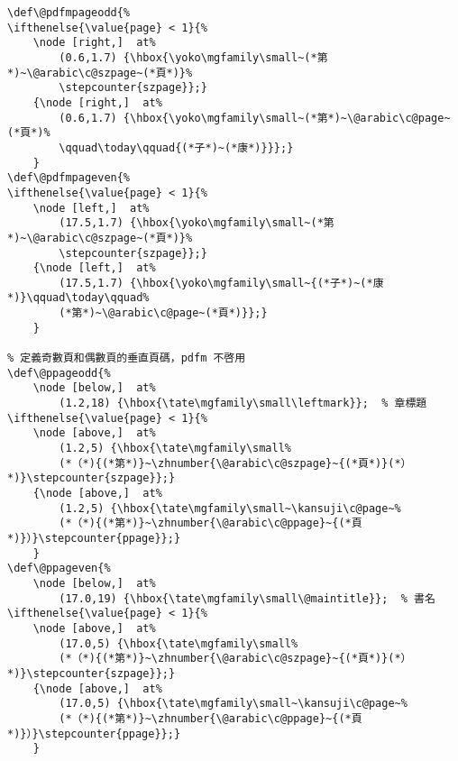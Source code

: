 \begin{lstlisting}[firstnumber=428]
% 定義奇數頁和偶數頁的水平頁碼，pdfm 啓用
\def\@pdfmpageodd{%
\ifthenelse{\value{page} < 1}{%
	\node [right,]  at%
		(0.6,1.7) {\hbox{\yoko\mgfamily\small~(*第*)~\@arabic\c@szpage~(*頁*)}%
		\stepcounter{szpage}};}
	{\node [right,]  at%
		(0.6,1.7) {\hbox{\yoko\mgfamily\small~(*第*)~\@arabic\c@page~(*頁*)%
		\qquad\today\qquad{(*子*)~(*康*)}}};}
	}
\def\@pdfmpageven{%
\ifthenelse{\value{page} < 1}{%
	\node [left,]  at%
		(17.5,1.7) {\hbox{\yoko\mgfamily\small~(*第*)~\@arabic\c@szpage~(*頁*)}%
		\stepcounter{szpage}};}
	{\node [left,]  at%
		(17.5,1.7) {\hbox{\yoko\mgfamily\small~{(*子*)~(*康*)}\qquad\today\qquad%
		(*第*)~\@arabic\c@page~(*頁*)}};}
	}

% 定義奇數頁和偶數頁的垂直頁碼，pdfm 不啓用
\def\@ppageodd{%
	\node [below,]  at%
		(1.2,18) {\hbox{\tate\mgfamily\small\leftmark}};  % 章標題
\ifthenelse{\value{page} < 1}{%
	\node [above,]  at%
		(1.2,5) {\hbox{\tate\mgfamily\small%
		(*（*){(*第*)}~\zhnumber{\@arabic\c@szpage}~{(*頁*)}(*）*)}\stepcounter{szpage}};}
	{\node [above,]  at%
		(1.2,5) {\hbox{\tate\mgfamily\small~\kansuji\c@page~%
		(*（*){(*第*)}~\zhnumber{\@arabic\c@ppage}~{(*頁*)}）}\stepcounter{ppage}};}
	}
\def\@ppageven{%
	\node [below,]  at%
		(17.0,19) {\hbox{\tate\mgfamily\small\@maintitle}};  % 書名
\ifthenelse{\value{page} < 1}{%
	\node [above,]  at%
		(17.0,5) {\hbox{\tate\mgfamily\small%
		(*（*){(*第*)}~\zhnumber{\@arabic\c@szpage}~{(*頁*)}(*）*)}\stepcounter{szpage}};}
	{\node [above,]  at%
		(17.0,5) {\hbox{\tate\mgfamily\small~\kansuji\c@page~%
		(*（*){(*第*)}~\zhnumber{\@arabic\c@ppage}~{(*頁*)}）}\stepcounter{ppage}};}
	}

\end{lstlisting}



